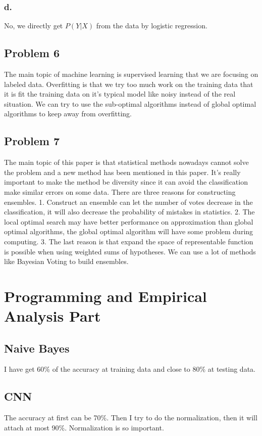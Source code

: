 \documentclass[12pt]{article}
\begin{document}
			\subsubsection{d.}
				No, we directly get $P(Y|X)$ from the data by logistic regression. 
		\subsection{Problem 6}
				The main topic of machine learning is supervised learning that we are focusing on labeled data. Overfitting is that we try too much work on the training data that it is fit the training data on it's typical model like noisy instead of the real situation. We can try to use the sub-optimal algorithms instead of global optimal algorithms to keep away from overfitting.
		\subsection{Problem 7}
			The main topic of this paper is that statistical methods nowadays cannot solve the problem and a new method has been mentioned in this paper. It's really important to make the method be diversity since it can avoid the classification make similar errors on some data. There are three reasons for constructing ensembles. 1. Construct an ensemble can let the number of votes decrease in the classification, it will also decrease the probability of mistakes in statistics. 2. The local optimal search may have better performance on approximation than global optimal algorithms, the global optimal algorithm will have some problem during computing. 3. The last reason is that expand the space of representable function is possible when using weighted sums of hypotheses. We can use a lot of methods like Bayesian Voting to build ensembles.
 	\section{Programming and Empirical Analysis Part}
		\subsection {Naive Bayes}
			I have get 60\% of the accuracy at training data and close to 80\% at testing data. 
		\subsection {CNN}
			The accuracy at first can be 70\%. Then I try to do the normalization, then it will attach at most 90\%. Normalization is so important.
\end{document}
